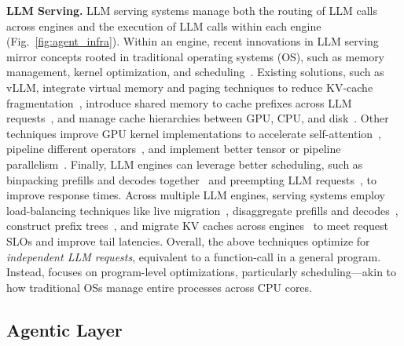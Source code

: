 \vspace{2mm}
\noindent \textbf{LLM Serving.} LLM serving systems manage both the routing of LLM calls across engines and the execution of LLM calls within each engine (Fig.~\ref{fig:agent_infra}). Within an engine, recent innovations in LLM serving mirror concepts rooted in traditional operating systems (OS), such as memory management, kernel optimization, and scheduling~\cite{mei2024aiosllmagentoperating, sun2024llumnixdynamicschedulinglarge}. Existing solutions, such as vLLM, integrate virtual memory and paging techniques to reduce KV-cache fragmentation~\cite{vllm}, introduce shared memory to cache prefixes across LLM requests~\cite{lin2024parrotefficientservingllmbased,zheng2024sglangefficientexecutionstructured}, and manage cache hierarchies between GPU, CPU, and disk~\cite{nanoflow, flexgen, slora}. Other techniques improve GPU kernel implementations to accelerate self-attention~\cite{flashattention}, pipeline different operators~\cite{nanoflow}, and implement better tensor or pipeline parallelism~\cite{fastserve, alpaserve}. Finally, LLM engines can leverage better scheduling, such as binpacking prefills and decodes together~\cite{agrawal2024tamingthroughputlatencytradeoffllm} and preempting LLM requests~\cite{fastserve}, to improve response times. Across multiple LLM engines, serving systems employ load-balancing techniques like live migration~\cite{llumnix}, disaggregate prefills and decodes~\cite{mooncake}, construct prefix trees~\cite{preble}, and migrate KV caches across engines~\cite{lin2024parrotefficientservingllmbased} to meet request SLOs and improve tail latencies. Overall, the above techniques optimize for \textit{independent LLM requests}, equivalent to a function-call in a general program. Instead, \text{\name} focuses on program-level optimizations, particularly scheduling—akin to how traditional OSs manage entire processes across CPU cores.


\subsection{Agentic Layer}
\label{sec:llm_agents}

